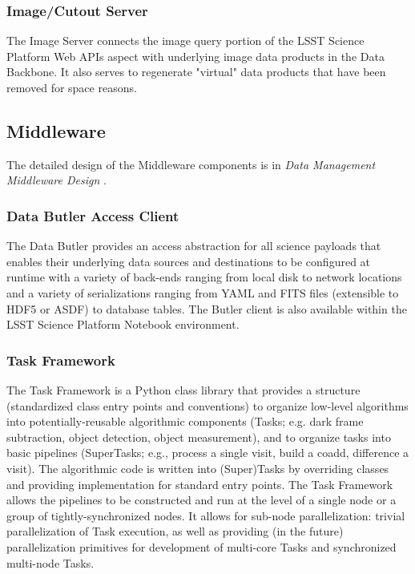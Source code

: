 \documentclass[DM,toc,lsstdraft]{lsstdoc}
\begin{document}
\subsubsection{Image/Cutout Server}\label{image-server}

The Image Server connects the image query portion of the LSST Science Platform Web APIs aspect with underlying image data products in the Data Backbone.
It also serves to regenerate "virtual" data products that have been removed for space reasons.

\subsection{Middleware}\label{middleware}

The detailed design of the Middleware components is in \textit{Data Management Middleware Design} .

\subsubsection{Data Butler Access
Client}\label{data-butler-access-client}

The Data Butler provides an access abstraction for all science payloads
that enables their underlying data sources and destinations to be
configured at runtime with a variety of back-ends ranging from local
disk to network locations and a variety of serializations ranging from
YAML and FITS files (extensible to HDF5 or ASDF) to database tables. The
Butler client is also available within the LSST Science Platform
Notebook environment.

\subsubsection{Task Framework}\label{task-framework}

The Task Framework is a Python class library that provides a structure
(standardized class entry points and conventions) to organize low-level
algorithms into potentially-reusable algorithmic components (Tasks; e.g.
dark frame subtraction, object detection, object measurement), and to
organize tasks into basic pipelines (SuperTasks; e.g., process a single
visit, build a coadd, difference a visit). The algorithmic code is
written into (Super)Tasks by overriding classes and providing
implementation for standard entry points. The Task Framework allows the
pipelines to be constructed and run at the level of a single node or a
group of tightly-synchronized nodes. It allows for sub-node
parallelization: trivial parallelization of Task execution, as well as
providing (in the future) parallelization primitives for development of
multi-core Tasks and synchronized multi-node Tasks.
\end{document}
